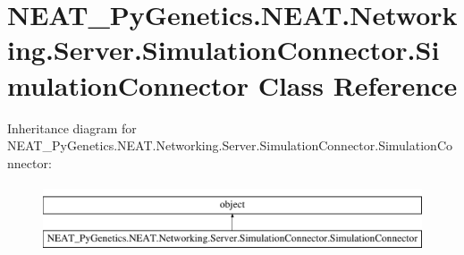\hypertarget{class_n_e_a_t___py_genetics_1_1_n_e_a_t_1_1_networking_1_1_server_1_1_simulation_connector_1_1_simulation_connector}{}\section{N\+E\+A\+T\+\_\+\+Py\+Genetics.\+N\+E\+A\+T.\+Networking.\+Server.\+Simulation\+Connector.\+Simulation\+Connector Class Reference}
\label{class_n_e_a_t___py_genetics_1_1_n_e_a_t_1_1_networking_1_1_server_1_1_simulation_connector_1_1_simulation_connector}
Inheritance diagram for N\+E\+A\+T\+\_\+\+Py\+Genetics.\+N\+E\+A\+T.\+Networking.\+Server.\+Simulation\+Connector.\+Simulation\+Connector\+:\begin{figure}[H]
\begin{center}
\leavevmode
\includegraphics[height=2.000000cm]{class_n_e_a_t___py_genetics_1_1_n_e_a_t_1_1_networking_1_1_server_1_1_simulation_connector_1_1_simulation_connector}
\end{center}
\end{figure}
